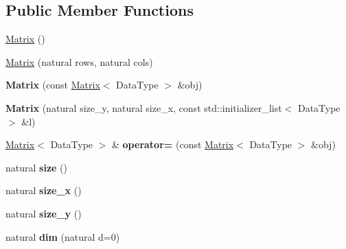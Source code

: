 \subsection*{Public Member Functions}
\begin{DoxyCompactItemize}
\item 
\hyperlink{classez_1_1maths_1_1Matrix_ab1ee41b4f342b94006853dc7213ab179}{Matrix} ()
\item 
\hyperlink{classez_1_1maths_1_1Matrix_a97b95c8be7fd18cf0beb2789dee19b2a}{Matrix} (natural rows, natural cols)
\item 
\mbox{\label{classez_1_1maths_1_1Matrix_a165b105b7f0457c5fe85448c44b08abe}} 
{\bfseries Matrix} (const \hyperlink{classez_1_1maths_1_1Matrix}{Matrix}$<$ Data\+Type $>$ \&obj)
\item 
\mbox{\label{classez_1_1maths_1_1Matrix_ad4600cc7e192a7c76858e3a629e71c91}} 
{\bfseries Matrix} (natural size\+\_\+y, natural size\+\_\+x, const std\+::initializer\+\_\+list$<$ Data\+Type $>$ \&l)
\item 
\mbox{\label{classez_1_1maths_1_1Matrix_ada5bd4986817d885f9bd33c7726618e9}} 
\hyperlink{classez_1_1maths_1_1Matrix}{Matrix}$<$ Data\+Type $>$ \& {\bfseries operator=} (const \hyperlink{classez_1_1maths_1_1Matrix}{Matrix}$<$ Data\+Type $>$ \&obj)
\item 
\mbox{\label{classez_1_1maths_1_1Matrix_a08f19b4b97c7e970b656d4f7ed520a3d}} 
natural {\bfseries size} ()
\item 
\mbox{\label{classez_1_1maths_1_1Matrix_a1c74dfc803ad0827c02fda54a811e518}} 
natural {\bfseries size\+\_\+x} ()
\item 
\mbox{\label{classez_1_1maths_1_1Matrix_a5648d269f07126af169f6667915ffc93}} 
natural {\bfseries size\+\_\+y} ()
\item 
\mbox{\label{classez_1_1maths_1_1Matrix_ab99b87184b37758d922b18bc930b07bd}} 
natural {\bfseries dim} (natural d=0)
\item 
\mbox{\label{classez_1_1maths_1_1Matrix_a7b1faaa410f83a2e1c9ae296e4dc7fe6}} 

\end{DoxyCompactItemize}
